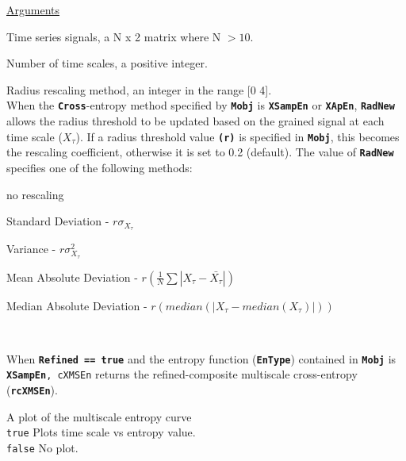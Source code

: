 \documentclass[12pt, a4paper, titlepage, openany]{book}
\begin{document}
\noindent \ul{Arguments}
\begin{description}[labelsep=1cm, labelwidth=2cm, nosep, style=multiline,leftmargin=3cm]\footnotesize
\item[\texttt{Sig}]		Time series signals, a N x 2 matrix where N $> 10$.
\item[\texttt{Scales}]		Number of time scales, a positive integer.
\item[\texttt{RadNew}]			Radius rescaling method, an integer in the range [0 4].\\
				 When the \texttt{\textbf{Cross}}-entropy method specified by \texttt{\textbf{Mobj}} is \texttt{\textbf{XSampEn}} or \texttt{\textbf{XApEn}}, \texttt{\textbf{RadNew}} allows the radius threshold to be updated based on the grained signal at each time scale ($X_\tau$). If a radius threshold value \texttt{\textbf{(r)}} is specified in \texttt{\textbf{Mobj}},  this becomes the rescaling coefficient, otherwise it is set to 0.2 (default). The value of \texttt{\textbf{RadNew}} specifies one of the following methods:
	\begin{description}[labelsep=5em, labelwidth=4em, nosep,style=multiline,leftmargin=2cm]
		\item[0]	no rescaling
		\item[1]    Standard Deviation          - $r\sigma_{X_\tau}$
        \item[2]    Variance                    - $r\sigma_{X_\tau}^2$
        \item[3]    Mean Absolute Deviation     - $r(\frac{1}{N} \sum |X_{\tau} - \bar{X_{\tau}}|) $
        \item[4]    Median Absolute Deviation   - $r(median(|X_{\tau} - median(X_{\tau})|)) $
	\end{description}
\ \\ 
\item[\texttt{Refined}]	 When \textbf{\texttt{Refined == true}} and the entropy function (\textbf{\texttt{EnType}}) contained in  \textbf{\texttt{Mobj}} is \texttt{\textbf{XSampEn}, cXMSEn} returns the refined-composite multiscale cross-entropy (\texttt{\textbf{rcXMSEn}}). \indent \cite{cMS2}
\item[\texttt{Plotx}]		A plot of the multiscale entropy curve\\
							\texttt{true} \hspace{15pt} Plots time scale vs entropy value.\\
							\texttt{false}\hspace{12pt} No plot.\\

\end{description}
\end{document}

